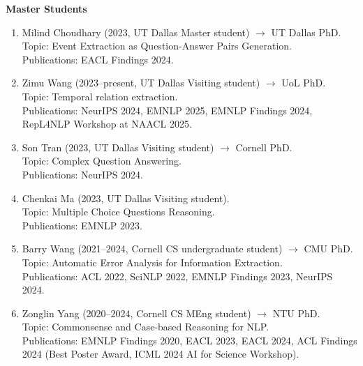 \noindent \textbf{Master Students}
\begin{enumerate}[label={},leftmargin=15pt]

\item \noindent Milind Choudhary (2023, UT Dallas Master student)  $\rightarrow$ UT Dallas PhD. \\
\indent Topic: Event Extraction as Question-Answer Pairs Generation. \\
\indent Publications: EACL Findings 2024.

\vspace{0.3mm}
\item Zimu Wang (2023--present, UT Dallas Visiting student) $\rightarrow$ UoL PhD.\\
Topic: Temporal relation extraction. \\
Publications: NeurIPS 2024, EMNLP 2025, EMNLP Findings 2024, RepL4NLP Workshop at NAACL 2025.

\vspace{0.3mm}
\item Son Tran (2023, UT Dallas Visiting student) $\rightarrow$ Cornell PhD. \\
Topic: Complex Question Answering. \\
Publications: NeurIPS 2024.

\vspace{0.3mm}
\item Chenkai Ma (2023, UT Dallas Visiting student). \\
Topic: Multiple Choice Questions Reasoning. \\
Publications: EMNLP 2023.

\vspace{0.3mm}
\item Barry Wang (2021--2024, Cornell CS undergraduate student) $\rightarrow$ CMU PhD. \\
Topic: Automatic Error Analysis for Information Extraction. \\
Publications: ACL 2022, SciNLP 2022, EMNLP Findings 2023, NeurIPS 2024.

\vspace{0.3mm}
\item Zonglin Yang (2020--2024, Cornell CS MEng student) $\rightarrow$ NTU PhD. \\
Topic: Commonsense and Case-based Reasoning for NLP. \\
Publications: EMNLP Findings 2020, EACL 2023, EACL 2024, ACL Findings 2024 (Best Poster Award, ICML 2024 AI for Science Workshop).


\end{enumerate}
